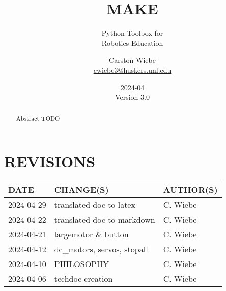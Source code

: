 \documentclass[12pt]{scrartcl} %
\title{MAKE}
\subtitle{
  Python Toolbox for \\
  Robotics Education
}
\author{
  Carston Wiebe \\
  \href{mailto:cwiebe3@huskers.unl.edu}{cwiebe3@huskers.unl.edu} \\
}
\date{
  2024-04 \\
  Version 3.0
}
\begin{document}

\maketitle
\thispagestyle{empty}

\vfill

\begin{abstract}
  Abstract TODO
\end{abstract}

\newpage
\clearpage

\section*{REVISIONS}

\begin{table}[htp]
  \centering
  \def\arraystretch{1.5}
  \begin{tabular}{|l|l|l|}
    \hline
    DATE       & CHANGE(S)                   & AUTHOR(S) \\
    \hline
    2024-04-29 & translated doc to latex     & C. Wiebe  \\
    \hline
    2024-04-22 & translated doc to markdown  & C. Wiebe  \\
    \hline
    2024-04-21 & largemotor \& button        & C. Wiebe  \\
    \hline
    2024-04-12 & dc\_motors, servos, stopall & C. Wiebe  \\
    \hline
    2024-04-10 & PHILOSOPHY                  & C. Wiebe  \\
    \hline
    2024-04-06 & techdoc creation            & C. Wiebe  \\
    \hline
  \end{tabular}
\end{table}

\newpage

\tableofcontents

\newpage
\end{document}
